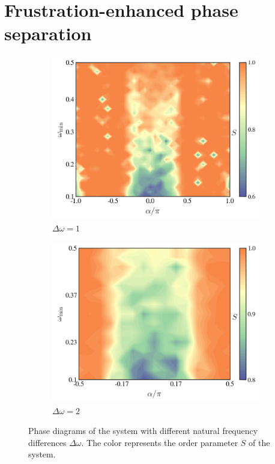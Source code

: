 \documentclass{article}
\begin{document}
\section{\label{sec:behaviors}Frustration-enhanced phase separation}
\begin{figure}[H]
    \centering
    \begin{subfigure}{0.45\textwidth}
        \centering
        \includegraphics[width=1\textwidth]{figs/pd1.png}
        \caption{$\Delta \omega=1$}
        \label{fig:phaseDiagramDeltaOmega1}
    \end{subfigure}
    \begin{subfigure}{0.45\textwidth}
        \centering
        \includegraphics[width=1\textwidth]{figs/pd2.png}
        \caption{$\Delta \omega=2$}
        \label{fig:phaseDiagramDeltaOmega2}
    \end{subfigure}
    \caption{Phase diagrams of the system with different natural frequency differences $\Delta \omega$. The color represents the order parameter $S$ of the system.}
    \label{fig:phaseDiagrams}
\end{figure}
\end{document}

